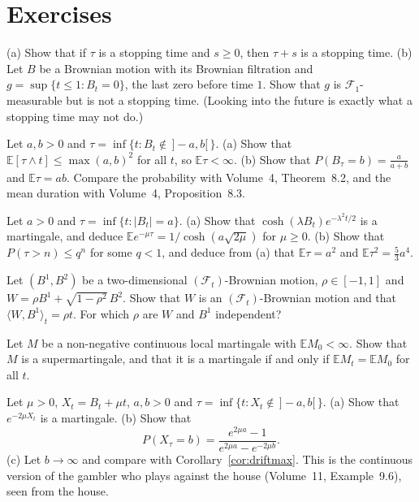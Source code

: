 \section{Exercises}

\begin{exercise}[$\star\star$]\label{ex:lastzero}
(a) Show that if $\tau$ is a stopping time and $s\ge0$, then $\tau+s$ is a stopping time. (b) Let $B$ be a Brownian motion with its Brownian filtration and $g=\sup\{t\le1:B_t=0\}$, the last zero before
time $1$. Show that $g$ is $\mathcal F_1$-measurable but is not a stopping time. (Looking into the future is exactly what a stopping time may not do.)
\end{exercise}

\begin{exercise}[$\star$]\label{ex:exit}
Let $a,b>0$ and $\tau=\inf\{t:B_t\notin\,]-a,b[\,\}$. (a) Show that $\mathbb E[\tau\wedge t]\le\max(a,b)^2$ for all $t$, so $\mathbb E\tau<\infty$. (b) Show that $P(B_\tau=b)=\frac a{a+b}$ and $\mathbb E\tau=ab$.
Compare the probability with Volume~4, Theorem~8.2, and the mean duration with Volume~4, Proposition~8.3.
\end{exercise}

\begin{exercise}[$\star\star$]\label{ex:cosh}
Let $a>0$ and $\tau=\inf\{t:|B_t|=a\}$. (a) Show that $\cosh(\lambda B_t)e^{-\lambda^2t/2}$ is a martingale, and deduce $\mathbb Ee^{-\mu\tau}=1/\cosh(a\sqrt{2\mu})$ for $\mu\ge0$. (b) Show that $P(\tau>n)\le q^n$
for some $q<1$, and deduce from (a) that $\mathbb E\tau=a^2$ and $\mathbb E\tau^2=\frac53a^4$.
\end{exercise}

\begin{exercise}[$\star$]\label{ex:correlated}
Let $(B^1,B^2)$ be a two-dimensional $(\mathcal F_t)$-Brownian motion, $\rho\in[-1,1]$ and $W=\rho B^1+\sqrt{1-\rho^2}\,B^2$. Show that $W$ is an $(\mathcal F_t)$-Brownian motion and that $\langle W,B^1\rangle_t=\rho t$.
For which $\rho$ are $W$ and $B^1$ independent?
\end{exercise}

\begin{exercise}[$\star\star$]\label{ex:superm}
Let $M$ be a non-negative continuous local martingale with $\mathbb EM_0<\infty$. Show that $M$ is a supermartingale, and that it is a martingale if and only if $\mathbb EM_t=\mathbb EM_0$ for all $t$.
\end{exercise}

\begin{exercise}[$\star\star$]\label{ex:driftruin}
Let $\mu>0$, $X_t=B_t+\mu t$, $a,b>0$ and $\tau=\inf\{t:X_t\notin\,]-a,b[\,\}$. (a) Show that $e^{-2\mu X_t}$ is a martingale. (b) Show that
\[
P(X_\tau=b)=\frac{e^{2\mu a}-1}{e^{2\mu a}-e^{-2\mu b}}.
\]
(c) Let $b\to\infty$ and compare with Corollary~\ref{cor:driftmax}. This is the continuous version of the gambler who plays against the house (Volume~11, Example~9.6), seen from the house.
\end{exercise}

